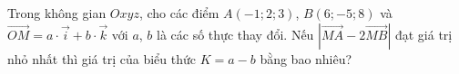 \begin{ex}
Trong không gian $Oxyz$, cho các điểm $A(-1;2;3)$, $B(6;-5;8)$ và $\overrightarrow{OM}=a\cdot\vec i+b\cdot\vec k$ với $a$, $b$ là các số thực thay đổi. Nếu $\left|\overrightarrow{MA}-2\overrightarrow{MB}\right|$ đạt giá trị nhỏ nhất thì giá trị của biểu thức $K=a-b$ bằng bao nhiêu?
\end{ex}
